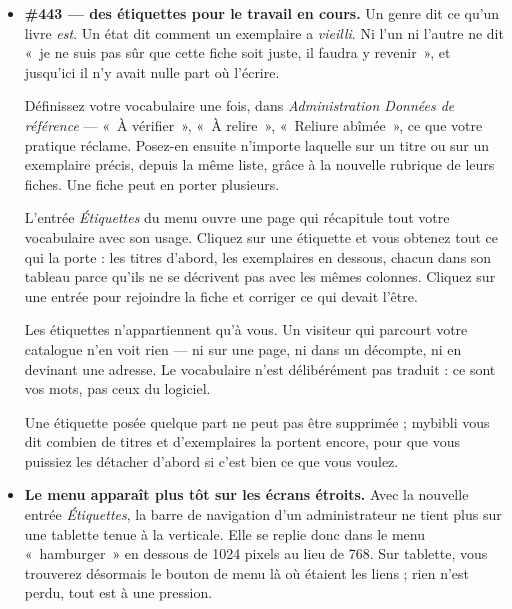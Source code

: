 \begin{itemize}
  \item \textbf{\#443 \string— des étiquettes pour le travail en
        cours.} Un genre dit ce qu'un livre \emph{est}. Un état dit
        comment un exemplaire a \emph{vieilli}. Ni l'un ni l'autre ne dit
        «~je ne suis pas sûr que cette fiche soit juste, il faudra y
        revenir~», et jusqu'ici il n'y avait nulle part où l'écrire.

        Définissez votre vocabulaire une fois, dans
        \emph{Administration \textrightarrow{} Données de référence}
        \string— «~À vérifier~», «~À relire~», «~Reliure abîmée~», ce que
        votre pratique réclame. Posez-en ensuite n'importe laquelle sur
        un titre ou sur un exemplaire précis, depuis la même liste, grâce
        à la nouvelle rubrique de leurs fiches. Une fiche peut en porter
        plusieurs.

        L'entrée \emph{Étiquettes} du menu ouvre une page qui récapitule
        tout votre vocabulaire avec son usage. Cliquez sur une étiquette
        et vous obtenez tout ce qui la porte : les titres d'abord, les
        exemplaires en dessous, chacun dans son tableau parce qu'ils ne
        se décrivent pas avec les mêmes colonnes. Cliquez sur une entrée
        pour rejoindre la fiche et corriger ce qui devait l'être.

        \begin{tip}
        Les étiquettes n'appartiennent qu'à vous. Un visiteur qui
        parcourt votre catalogue n'en voit rien \string— ni sur une page,
        ni dans un décompte, ni en devinant une adresse. Le vocabulaire
        n'est délibérément pas traduit : ce sont vos mots, pas ceux du
        logiciel.
        \end{tip}

        Une étiquette posée quelque part ne peut pas être supprimée ;
        mybibli vous dit combien de titres et d'exemplaires la portent
        encore, pour que vous puissiez les détacher d'abord si c'est bien
        ce que vous voulez.
  \item \textbf{Le menu apparaît plus tôt sur les écrans étroits.} Avec
        la nouvelle entrée \emph{Étiquettes}, la barre de navigation d'un
        administrateur ne tient plus sur une tablette tenue à la
        verticale. Elle se replie donc dans le menu «~hamburger~» en
        dessous de 1024 pixels au lieu de 768. Sur tablette, vous
        trouverez désormais le bouton de menu là où étaient les liens ;
        rien n'est perdu, tout est à une pression.
\end{itemize}

